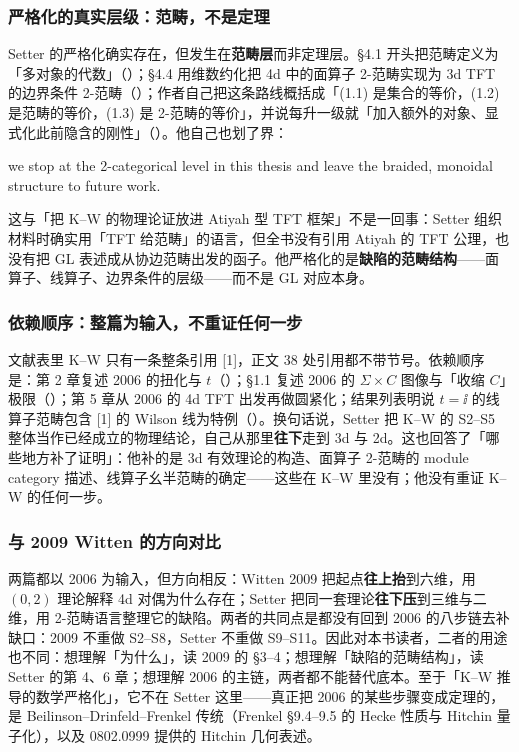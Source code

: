 \subsubsection*{严格化的真实层级：范畴，不是定理}

Setter 的严格化确实存在，但发生在\textbf{范畴层}而非定理层。\S4.1 开头把范畴定义为「多对象的代数」（）；\S4.4 用维数约化把 4d 中的面算子 2-范畴实现为 3d TFT 的边界条件 2-范畴（）；作者自己把这条路线概括成「(1.1) 是集合的等价，(1.2) 是范畴的等价，(1.3) 是 2-范畴的等价」，并说每升一级就「加入额外的对象、显式化此前隐含的刚性」（）。\pA 他自己也划了界：\pA
\begin{origquote}
we stop at the 2-categorical level in this thesis and leave the braided, monoidal structure to future work. 
\end{origquote}
这与「把 K--W 的物理论证放进 Atiyah 型 TFT 框架」不是一回事：Setter 组织材料时确实用「TFT 给范畴」的语言，但全书没有引用 Atiyah 的 TFT 公理，也没有把 GL 表述成从协边范畴出发的函子。\pC 他严格化的是\textbf{缺陷的范畴结构}——面算子、线算子、边界条件的层级——而不是 GL 对应本身。\pC

\subsubsection*{依赖顺序：整篇为输入，不重证任何一步}

文献表里 K--W 只有一条整条引用 [1]，正文 38 处引用都不带节号。\pA 依赖顺序是：第 2 章复述 2006 的扭化与 $t$（）；\S1.1 复述 2006 的 $\Sigma\times C$ 图像与「收缩 $C$」极限（）；第 5 章从 2006 的 4d TFT 出发再做圆紧化；结果列表明说 $t=\ii$ 的线算子范畴包含 [1] 的 Wilson 线为特例（）。\pA 换句话说，Setter 把 K--W 的 S2--S5 整体当作已经成立的物理结论，自己从那里\textbf{往下}走到 3d 与 2d。\pB 这也回答了「哪些地方补了证明」：他补的是 3d 有效理论的构造、面算子 2-范畴的 module category 描述、线算子幺半范畴的确定——这些在 K--W 里没有；他没有重证 K--W 的任何一步。\pB

\subsubsection*{与 2009 Witten 的方向对比}

两篇都以 2006 为输入，但方向相反：Witten 2009 把起点\textbf{往上抬}到六维，用 $(0,2)$ 理论解释 4d 对偶为什么存在；Setter 把同一套理论\textbf{往下压}到三维与二维，用 2-范畴语言整理它的缺陷。\pC 两者的共同点是都没有回到 2006 的八步链去补缺口：2009 不重做 S2--S8，Setter 不重做 S9--S11。\pC 因此对本书读者，二者的用途也不同：想理解「为什么」，读 2009 的 §3--4；想理解「缺陷的范畴结构」，读 Setter 的第 4、6 章；想理解 2006 的主链，两者都不能替代底本。\pC 至于「K--W 推导的数学严格化」，它不在 Setter 这里——真正把 2006 的某些步骤变成定理的，是 Beilinson--Drinfeld--Frenkel 传统（Frenkel \S9.4--9.5 的 Hecke 性质与 Hitchin 量子化），以及 0802.0999 提供的 Hitchin 几何表述。\pC

